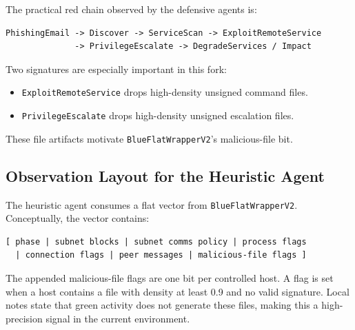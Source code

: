 The practical red chain observed by the defensive agents is:

\begin{lstlisting}
PhishingEmail -> Discover -> ServiceScan -> ExploitRemoteService
              -> PrivilegeEscalate -> DegradeServices / Impact
\end{lstlisting}

Two signatures are especially important in this fork:
\begin{itemize}
  \item \texttt{ExploitRemoteService} drops high-density unsigned command files.
  \item \texttt{PrivilegeEscalate} drops high-density unsigned escalation files.
\end{itemize}

These file artifacts motivate \texttt{BlueFlatWrapperV2}'s malicious-file bit.

\subsection{Observation Layout for the Heuristic Agent}

The heuristic agent consumes a flat vector from \texttt{BlueFlatWrapperV2}. Conceptually, the vector contains:

\begin{lstlisting}
[ phase | subnet blocks | subnet comms policy | process flags
  | connection flags | peer messages | malicious-file flags ]
\end{lstlisting}

The appended malicious-file flags are one bit per controlled host. A flag is set when a host contains a file with density at least 0.9 and no valid signature. Local notes state that green activity does not generate these files, making this a high-precision signal in the current environment.
